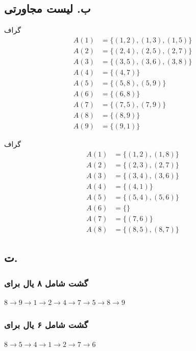 \documentclass{article}
\begin{document}
\begin{multicols}{2}
\subsection*{ب. لیست مجاورتی}
گراف 
\begin{align*}
A( 1 ) &= \{( 1, 2 ), ( 1, 3 ), ( 1, 5 ) \}\\
A( 2 ) &= \{( 2, 4 ), ( 2, 5 ), ( 2, 7 ) \}\\
A( 3 ) &= \{( 3, 5 ), ( 3, 6 ), ( 3, 8 ) \}\\
A( 4 ) &= \{( 4, 7 ) \}\\
A( 5 ) &= \{( 5, 8 ), ( 5, 9 ) \}\\
A( 6 ) &= \{( 6, 8 ) \}\\
A( 7 ) &= \{( 7, 5 ), ( 7, 9 ) \}\\
A( 8 ) &= \{( 8, 9 ) \}\\
A( 9 ) &= \{( 9, 1 ) \}
\end{align*}

گراف 
\begin{align*}
A( 1 ) &= \{( 1, 2 ), ( 1, 8 ) \}\\
A( 2 ) &= \{( 2, 3 ), ( 2, 7 ) \}\\
A( 3 ) &= \{( 3, 4 ), ( 3, 6 ) \}\\
A( 4 ) &= \{( 4, 1 ) \}\\
A( 5 ) &= \{( 5, 4 ), ( 5, 6 ) \}\\
A( 6 ) &= \{ \}\\
A( 7 ) &= \{( 7, 6 ) \}\\
A( 8 ) &= \{( 8, 5 ), ( 8, 7 ) \}
\end{align*}

\subsection*{ت.}

\subsubsection*{گشت شامل ۸ یال برای }
\begin{LTR}
$8 \rightarrow 9 \rightarrow 1 \rightarrow 2 \rightarrow 4 \rightarrow 7 \rightarrow 5 \rightarrow 8 \rightarrow 9$
\end{LTR}

\subsubsection*{گشت شامل ۶ یال برای }
\begin{LTR}
$8 \rightarrow 5 \rightarrow 4 \rightarrow 1 \rightarrow 2 \rightarrow 7 \rightarrow 6$
\end{LTR}


\end{multicols}
\end{document}
